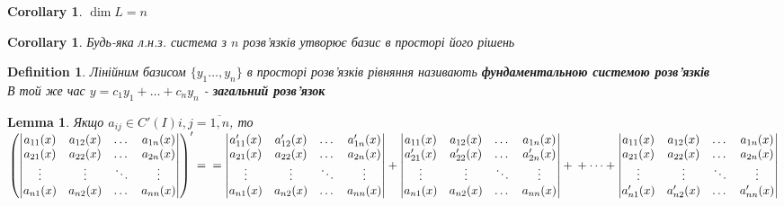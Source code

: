 \documentclass[a4paper, 10pt]{article}
\theoremstyle{theoremdd}
\theoremstyle{theoremdd}
\newtheorem{definition}[theorem]{Definition}
\theoremstyle{theoremdd}
\theoremstyle{theoremdd}
\theoremstyle{theoremdd}
\theoremstyle{theoremdd}
\theoremstyle{theoremdd}
\newtheorem{lemma}[theorem]{Lemma}
\theoremstyle{theoremdd}
\newtheorem{corollary}[theorem]{Corollary}
\begin{document}
\begin{corollary}
 $\dim L = n$
 \end{corollary}

\begin{corollary}
 Будь-яка л.н.з. система з $n$ розв'язків утворює базис в просторі його рішень
 \end{corollary}

\begin{definition}
 Лінійним базисом $\{y_1 \dots, y_n\}$ в просторі розв'язків рівняння називають \textbf{фундаментальною системою розв'язків}\\
В той же час $y = c_1 y_1 + \dots + c_n y_n$ - \textbf{загальний розв'язок}\\
\end{definition}

\begin{lemma}
 Якщо $a_{ij} \in C'(I) i,j = \overline{1,n}$, то\\
$\displaystyle \left(
\begin{vmatrix} 
	a_{11}(x) &  a_{12}(x) & \dots & a_{1n}(x) \\ 
	a_{21}(x) &  a_{22}(x) & \dots & a_{2n}(x) \\ 
	\vdots &  \vdots & \ddots & \vdots \\
	a_{n1}(x) &  a_{n2}(x) & \dots & a_{nn}(x) \\ 
\end{vmatrix}
\right)' = \\ =
\begin{vmatrix} 
	a'_{11}(x) &  a'_{12}(x) & \dots & a'_{1n}(x) \\ 
	a_{21}(x) &  a_{22}(x) & \dots & a_{2n}(x) \\ 
	\vdots &  \vdots & \ddots & \vdots \\
	a_{n1}(x) &  a_{n2}(x) & \dots & a_{nn}(x) \\ 
\end{vmatrix}
+
\begin{vmatrix} 
	a_{11}(x) &  a_{12}(x) & \dots & a_{1n}(x) \\ 
	a'_{21}(x) &  a'_{22}(x) & \dots & a'_{2n}(x) \\ 
	\vdots &  \vdots & \ddots & \vdots \\
	a_{n1}(x) &  a_{n2}(x) & \dots & a_{nn}(x) \\ 
\end{vmatrix}
+ \\ \\ + \dots +
\begin{vmatrix} 
	a_{11}(x) &  a_{12}(x) & \dots & a_{1n}(x) \\ 
	a_{21}(x) &  a_{22}(x) & \dots & a_{2n}(x) \\ 
	\vdots &  \vdots & \ddots & \vdots \\
	a'_{n1}(x) &  a'_{n2}(x) & \dots & a'_{nn}(x) \\ 
\end{vmatrix}
$
\end{lemma}
\end{document}

